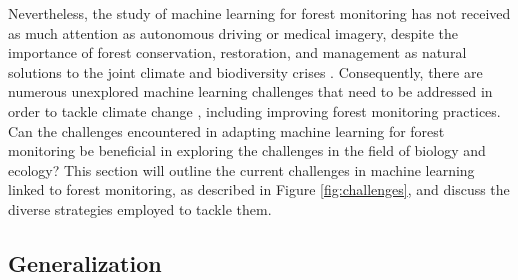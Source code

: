 \documentclass{CUP-JNL-DTM}%
\theoremstyle{definition}
\numberwithin{equation}{section}
\begin{document}
%
%
%
Nevertheless, the study of machine learning for forest monitoring has not received as much attention as autonomous driving or medical imagery, despite the importance of forest conservation, restoration, and management as natural solutions to the joint climate and biodiversity crises \cite{intergovernmental_panel_on_climate_change_ipcc_climate_2023}. Consequently, there are numerous unexplored machine learning challenges that need to be addressed in order to tackle climate change \cite{rolnick_tackling_2023}, including improving forest monitoring practices.
%
Can the challenges encountered in adapting machine learning for forest monitoring be beneficial in exploring the challenges in the field of biology and ecology?
%
This section will outline the current challenges in machine learning linked to forest monitoring, as described in Figure \ref{fig:challenges}, and discuss the diverse strategies employed to tackle them.


\subsection{Generalization} 
\label{sec:ml_generalization}
\end{document}
